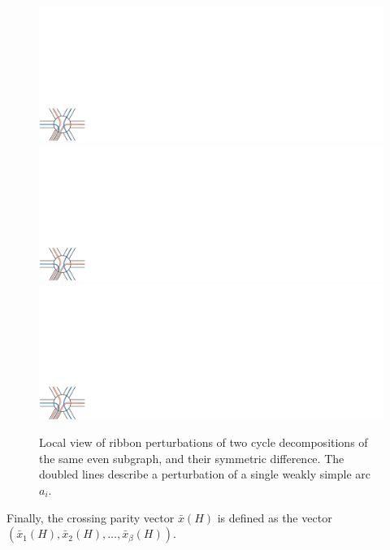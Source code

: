 \documentclass[letterpaper,review]{siamart190516}
\begin{document}
\begin{figure}[htb]
\centering
\includegraphics[scale=0.5,page=1]{Fig/cycle-decomp-independence}\qquad
\includegraphics[scale=0.5,page=2]{Fig/cycle-decomp-independence}\qquad
\includegraphics[scale=0.5,page=3]{Fig/cycle-decomp-independence}
\caption{Local view of ribbon perturbations of two cycle decompositions of the same even subgraph, and their symmetric difference.  The doubled lines describe a perturbation of a single weakly simple arc $a_i$.}
\label{F:cycle-decomp}
\end{figure}

Finally, the crossing parity vector $\bar{x}(H)$ is defined as the vector $(\bar{x}_1(H), \bar{x}_2(H), \dots, \bar{x}_\beta(H))$.
\end{document}
